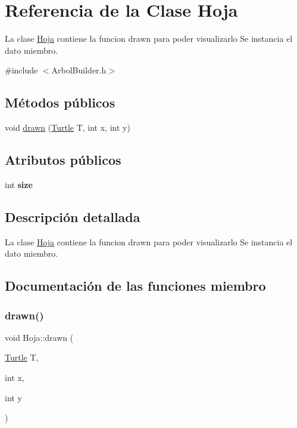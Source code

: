 \hypertarget{classHoja}{}\section{Referencia de la Clase Hoja}
\label{classHoja}


La clase \hyperlink{classHoja}{Hoja} contiene la funcion drawn para poder visualizarlo  Se instancia el dato miembro.  




{\ttfamily \#include $<$Arbol\+Builder.\+h$>$}

\subsection*{Métodos públicos}
\begin{DoxyCompactItemize}
\item 
void \hyperlink{classHoja_aa870a3c3140e05a139d0293c3e9ca426}{drawn} (\hyperlink{classTurtle}{Turtle} T, int x, int y)
\end{DoxyCompactItemize}
\subsection*{Atributos públicos}
\begin{DoxyCompactItemize}
\item 
\mbox{\label{classHoja_aebe2199a9f2c6774d3cbd51493ca67d6}} 
int {\bfseries size}
\end{DoxyCompactItemize}


\subsection{Descripción detallada}
La clase \hyperlink{classHoja}{Hoja} contiene la funcion drawn para poder visualizarlo  Se instancia el dato miembro. 

\subsection{Documentación de las funciones miembro}
\mbox{\label{classHoja_aa870a3c3140e05a139d0293c3e9ca426}} 
\subsubsection{\texorpdfstring{drawn()}{drawn()}}
{\footnotesize\ttfamily void Hoja\+::drawn (\begin{DoxyParamCaption}\item[{\hyperlink{classTurtle}{Turtle}}]{T,  }\item[{int}]{x,  }\item[{int}]{y }\end{DoxyParamCaption})}

